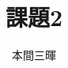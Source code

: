 \documentclass[titlepage,a4paper]{jsarticle}
\title{課題2}
\author{本間三暉}
\begin{document}
\maketitle

\begin{thebibliography}{99}
\bibitem{}
\end{thebibliography}
\end{document}

